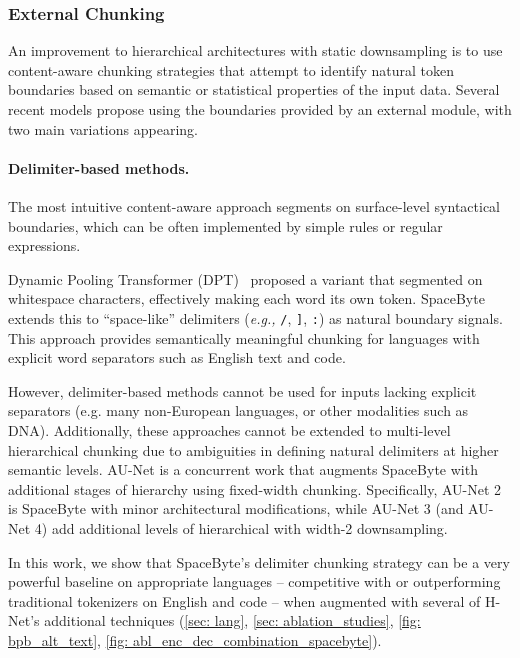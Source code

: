 \documentclass{article}
\newcommand{\citep}{\parencite}
\newcommand{\eg}{\emph{e.g.,}}
\theoremstyle{plain}
\theoremstyle{remark}
\begin{document}
\subsubsection{External Chunking}
\label{sec:background:ar:external} 

An improvement to hierarchical architectures with static downsampling is to use content-aware chunking strategies that attempt to identify natural token boundaries based on semantic or statistical properties of the input data.
Several recent models propose using the boundaries provided by an external module, with two main variations appearing.

\paragraph{Delimiter-based methods.}
The most intuitive content-aware approach segments on surface-level syntactical boundaries, which can be often implemented by simple rules or regular expressions.

Dynamic Pooling Transformer (DPT)~\citep{DPT} proposed a variant that segmented on whitespace characters, effectively making each word its own token.
SpaceByte~\citep{SpaceByte} extends this to ``space-like'' delimiters (\eg{} \texttt{/}, \texttt{]}, \texttt{:}) as natural boundary signals. 
This approach provides semantically meaningful chunking for languages with explicit word separators such as English text and code.

However, delimiter-based methods cannot be used for inputs lacking explicit separators (e.g. many non-European languages, or other modalities such as DNA). 
Additionally, these approaches cannot be extended to multi-level hierarchical chunking due to ambiguities in defining natural delimiters at higher semantic levels.
AU-Net \citep{AUNet} is a concurrent work that augments SpaceByte with additional stages of hierarchy using fixed-width chunking.
Specifically, AU-Net 2 is SpaceByte with minor architectural modifications, while AU-Net 3 (and AU-Net 4) add additional levels of hierarchical with width-2 downsampling.

In this work, we show that SpaceByte's delimiter chunking strategy can be a very powerful baseline on appropriate languages -- competitive with or outperforming traditional tokenizers on English and code -- when augmented with several of H-Net's additional techniques (\cref{sec: lang}, \cref{sec: ablation_studies}, \cref{fig: bpb_alt_text}, \cref{fig: abl_enc_dec_combination_spacebyte}).
\end{document}
